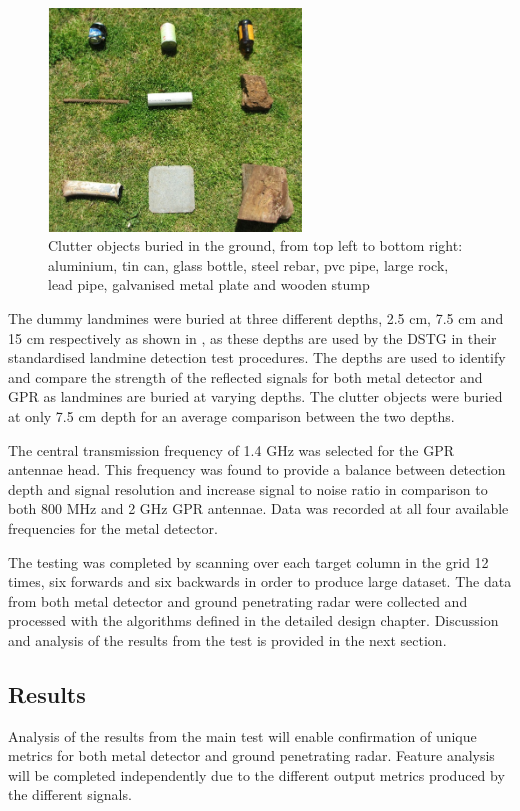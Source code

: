\documentclass[main.tex]{subfiles}
\begin{document}
\begin{figure}[ht]
\includegraphics[width=0.6\textwidth]{5-Testing/clutter.PNG}
\centering
\caption[Clutter objects buried in the ground]{Clutter objects buried in the ground, from top left to bottom right: aluminium, tin can, glass bottle, steel rebar, pvc pipe, large rock, lead pipe, galvanised metal plate and wooden stump}
\end{figure}

The dummy landmines were buried at three different depths, 2.5 cm, 7.5 cm and 15 cm respectively as shown in , as these depths are used by the DSTG in their standardised landmine detection test procedures. The depths are used to identify and compare the strength of the reflected signals for both metal detector and GPR as landmines are buried at varying depths. The clutter objects were buried at only 7.5 cm depth for an average comparison between the two depths. 

The central transmission frequency of 1.4 GHz was selected for the GPR antennae head. This frequency was found to provide a balance between detection depth and signal resolution and increase signal to noise ratio in comparison to both 800 MHz and 2 GHz GPR antennae. Data was recorded at all four available frequencies for the metal detector.

The testing was completed by scanning over each target column in the grid 12 times, six forwards and six backwards in order to produce large dataset. The data from both metal detector and ground penetrating radar were collected and processed with the algorithms defined in the detailed design chapter. Discussion and analysis of the results from the test is provided in the next section. 

\subsection{Results}
Analysis of the results from the main test will enable confirmation of unique metrics for both metal detector and ground penetrating radar. Feature analysis will be completed independently due to the different output metrics produced by the different signals. 
\end{document}

